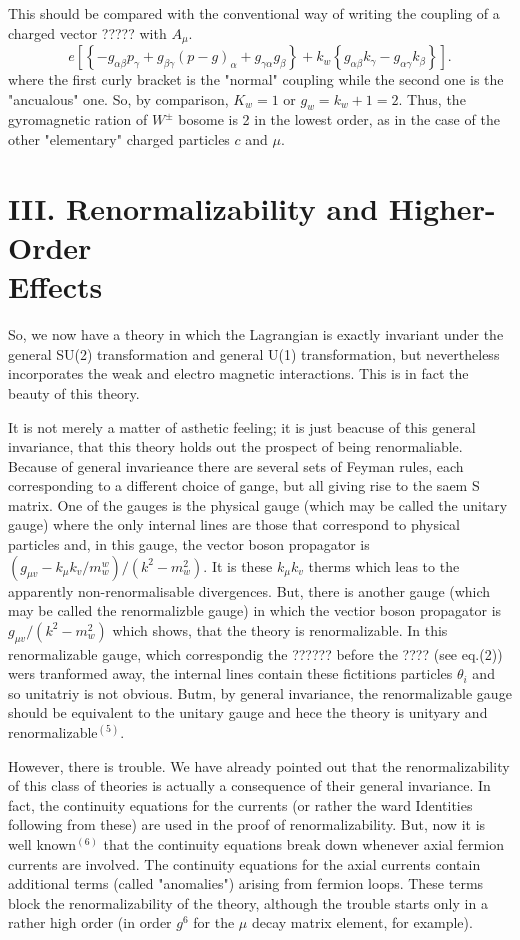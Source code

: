 This should be compared with the conventional way of writing the coupling of a charged vector ????? with $A_{\mu}$.
$$
e\left[\left\{-g_{\alpha \beta} p_{\gamma} + g_{\beta \gamma}(p-g)_{\alpha} + g_{\gamma \alpha} g_{\beta}\right\} + k_{w} \left\{g_{\alpha \beta} k_{\gamma} - g_{\alpha \gamma} k_{\beta} \right\}\right].
$$
where the first curly bracket is the "normal" coupling while the second one is the "ancualous" one. So, by comparison, $K_{w} = 1$ or $g_{w}= k_{w} + 1 = 2$. Thus, the gyromagnetic ration of $W^{\pm}$ bosome is 2 in the lowest order, as in the case of the other "elementary" charged particles $c$ and $\mu$.

\section*{III. Renormalizability and Higher-Order\\ Effects}

So, we now have a theory in which the Lagrangian is exactly invariant under the general SU(2) transformation and general U(1) transformation, but nevertheless incorporates the weak and electro magnetic interactions. This is in fact the beauty of this theory.

It is not merely a matter of asthetic feeling; it is just beacuse of this general invariance, that this theory holds out the prospect of being renormaliable. Because of general invarieance there are several sets of Feyman rules, each corresponding to a different choice of gange, but all giving rise to the saem S matrix. One of the gauges is the physical gauge (which may be called the unitary gauge) where the only internal lines are those that correspond  to physical particles and, in this gauge, the vector boson propagator is $(g_{\mu v} - k_{\mu} k_{v}/m^{w}_{w})/(k^{2}-m^{2}_{w})$. It is these $k_{\mu} k_{v}$ therms which leas to the apparently non-renormalisable divergences. But, there is another gauge (which may be called the renormalizble gauge) in which the vectior boson propagator is $g_{\mu v}/(k^{2}-m_{w}^{2})$ which shows, that the theory is renormalizable. In this renormalizable gauge, which correspondig the ?????? before the ???? (see eq.(2)) wers tranformed away, the internal lines contain these fictitions particles $\theta_{i}$ and so unitatriy is not obvious. Butm, by general invariance, the renormalizable gauge should be equivalent to the unitary gauge and hece the theory is unityary and renormalizable$^{(5)}$.

However, there is trouble. We have already pointed out that the renormalizability of this class of theories is actually a consequence of their  general invariance. In fact, the continuity equations for the currents (or rather the ward Identities following from these) are used in the proof of renormalizability. But, now it is well known$^{(6)}$ that the continuity equations break down whenever axial fermion currents are involved. The continuity equations for the axial currents contain additional terms (called "anomalies") arising from fermion loops. These terms block the renormalizability of the theory, although the trouble starts only in a rather high order (in order $g^{6}$ for the $\mu$ decay matrix element, for example).

